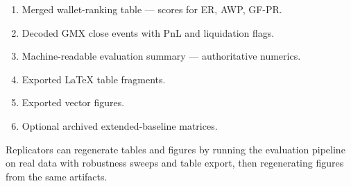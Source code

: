 
\begin{enumerate}
\item Merged wallet-ranking table --- scores for ER, AWP, GF-PR.
\item Decoded GMX close events with PnL and liquidation flags.
\item Machine-readable evaluation summary --- authoritative numerics.
\item Exported LaTeX table fragments.
\item Exported vector figures.
\item Optional archived extended-baseline matrices.
\end{enumerate}

Replicators can regenerate tables and figures by running the evaluation pipeline on real data with robustness sweeps and table export, then regenerating figures from the same artifacts.
